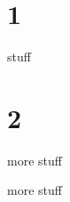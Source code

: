 \documentclass{beamer}
\begin{document}
    \section{1}
        \begin{frame}
            stuff
        \end{frame}
    \section{2}
        \begin{frame}
            more stuff
        \end{frame}
    \appendix
    \begin{frame}
        more stuff
    \end{frame}
\end{document}
